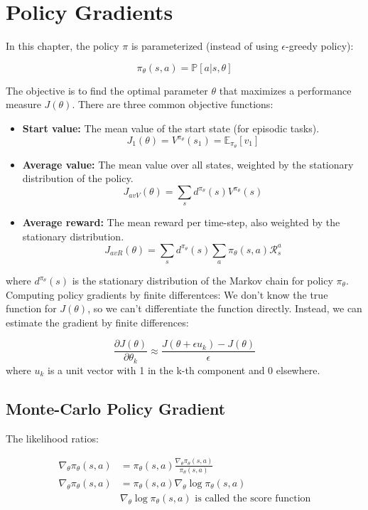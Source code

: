 \section{Policy Gradients}

In this chapter, the policy $\pi$ is parameterized (instead of using
$\epsilon$-greedy policy):

\[
    \pi_\theta(s,a) = \mathbb{P}[a|s,\theta]
\]

\noindent The objective is to find the optimal parameter $\theta$ that maximizes a
performance measure $J(\theta)$. There are three common objective functions:
\begin{itemize}
    \item \textbf{Start value:} The mean value of the start state (for episodic tasks).
          \[
              J_1(\theta) = V^{\pi_\theta}(s_1) = \mathbb{E}_{\pi_\theta}[v_1]
          \]
    \item \textbf{Average value:} The mean value over all states, weighted by the stationary distribution of the policy.
          \[
              J_{avV}(\theta) = \sum_{s} d^{\pi_\theta}(s) V^{\pi_\theta}(s)
          \]
    \item \textbf{Average reward:} The mean reward per time-step, also weighted by the stationary distribution.
          \[
              J_{avR}(\theta) = \sum_{s} d^{\pi_\theta}(s) \sum_{a} \pi_\theta(s, a) \mathcal{R}_s^a
          \]
\end{itemize}

\noindent where $d^{\pi_\theta}(s)$ is the stationary distribution of the Markov chain
for policy $\pi_\theta$.\\

\noindent Computing policy gradients by finite differentces: We don't know the true
function for $J(\theta)$, so we can't differentiate the function directly.
Instead, we can estimate the gradient by finite differences:

\[
    \frac{\partial J(\theta)}{\partial \theta_k} \approx \frac{J(\theta + \epsilon u_k) - J(\theta)}{\epsilon}
\]
where $u_k$ is a unit vector with 1 in the k-th component and 0 elsewhere.

\subsection{Monte-Carlo Policy Gradient}

The likelihood ratios:

\begin{align*}
    \nabla_\theta \pi_\theta(s,a) & = \pi_\theta(s,a) \frac{\nabla_\theta \pi_\theta(s,a)}{\pi_\theta(s,a)} \\
    \nabla_\theta \pi_\theta(s,a) & = \pi_\theta(s,a) \nabla_\theta \log \pi_\theta(s,a)                    \\
                                  & \nabla_\theta \log \pi_\theta(s,a) \text{ is called the score function}
\end{align*}

